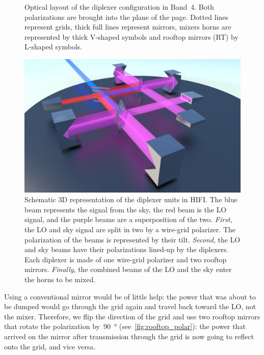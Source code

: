 \begin{figure}[p]
    \centering
    \footnotesize
    
    \caption{Optical layout of the diplexer configuration in Band~4.
    Both polarizations are brought into the plane of the page.
    Dotted lines represent grids, thick full lines represent mirrors, mixers horns are represented by thick V-shaped symbols and rooftop mirrors (RT) by L-shaped symbols.
    }
    \label{fig:diplexer_layout}
\end{figure}
\begin{figure}[p]
    \centering
    \includegraphics[width=\textwidth]{diplexer_render_lowres}
    \caption{
        Schematic 3D representation of the diplexer units in HIFI.
        The blue beam represents the signal from the sky, the red beam is the LO signal,
        and the purple beams are a superposition of the two.
        \emph{First}, the LO and sky signal are split in two by a wire-grid polarizer.
        The polarization of the beams is represented by their tilt.
        \emph{Second}, the LO and sky beams have their polarizations lined-up by the diplexers.
        Each diplexer is made of one wire-grid polarizer and two rooftop mirrors.
        \emph{Finally}, the combined beams of the LO and the sky enter the horns to be mixed.
    }
    \label{fig:diplexer_render}
\end{figure}

Using a conventional mirror would be of little help: the power that was about to be dumped would go through the grid again and travel back toward the LO, not the mixer.
Therefore, we flip the direction of the grid and use two rooftop mirrors that rotate the polarization by~\SI{90}{\degree} (see~\vref{fig:rooftop_polar}): the power that arrived on the mirror after transmission through the grid is now going to reflect onto the grid, and vice versa.

